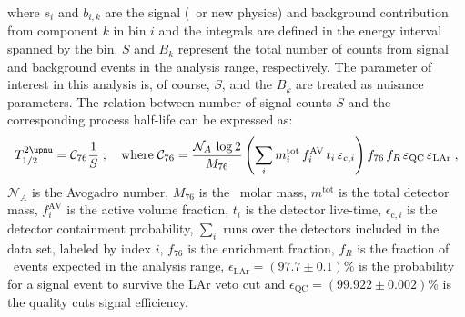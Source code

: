 where $s_i$ and $b_{i,k}$ are the signal (\nnbb\ or new physics) and background
contribution from component $k$ in bin $i$ and the integrals are defined in the energy
interval spanned by the bin. $S$ and $B_k$ represent the total number of counts from
signal and background events in the analysis range, respectively. The parameter of
interest in this analysis is, of course, $S$, and the $B_k$ are treated as nuisance
parameters. The relation between number of signal counts $S$ and the corresponding process
half-life can be expressed as:
\begin{equation}\label{eq:2nbb-ana:halflife}
  \thalftwoM = \mathcal{C}_{76} \frac{1}{S}\;;\quad
    \text{where}\; \mathcal{C}_{76} = \frac{\mathcal{N}_A\, \log2}{M_{76}}
      \left( \sum_i m^\text{tot}_i \, f^\text{AV}_i \, t_i \,
      \epsilon_{\text{c},i} \right) f_{76} \, f_R \, \epsilon_\text{QC} \, \epsilon_\text{LAr} \;,
\end{equation}
$\mathcal{N}_A$ is the Avogadro number, $M_{76}$ is the \gesix\ molar mass, $m^\text{tot}$
is the total detector mass, $f^\text{AV}_i$ is the active volume fraction, $t_i$ is the
detector live-time, $\epsilon_{\text{c},i}$ is the detector containment probability,
$\sum_i$ runs over the detectors included in the data set, labeled by index $i$, $f_{76}$
is the enrichment fraction, $f_R$ is the fraction of \nnbb\ events expected in the
analysis range, $\epsilon_\text{LAr} = (97.7 \pm 0.1)\%$ is the probability for a signal
event to survive the LAr veto cut and $\epsilon_\text{QC} = (99.922 \pm 0.002)\%$ is the
quality cuts signal efficiency.

